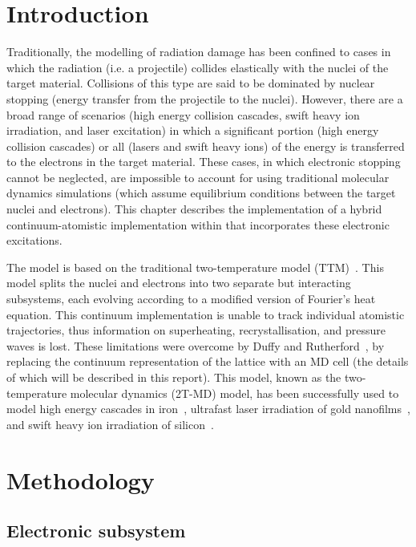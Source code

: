 \section{Introduction}
 
Traditionally, the modelling of radiation damage has been confined to 
cases in which the radiation (i.e. a projectile) collides elastically with the 
nuclei of the target material. Collisions of this type are said to be 
dominated by nuclear stopping (energy transfer from the projectile 
to the nuclei). However, there are a broad range of scenarios (high 
energy collision cascades, swift heavy ion irradiation, and laser 
excitation) in which a significant portion (high energy collision cascades) 
or all (lasers and swift heavy ions) of the energy is transferred to the 
electrons in the target material. These cases, in which electronic stopping 
cannot be neglected, are impossible to account for using traditional 
molecular dynamics simulations (which assume equilibrium conditions 
between the target nuclei and electrons). This chapter describes the 
implementation of a hybrid continuum-atomistic implementation within \D 
that incorporates these electronic excitations.

The model is based on the traditional two-temperature model 
(TTM)~\cite{lifshits-60a}. This model splits the nuclei and electrons 
into two separate but interacting subsystems, each evolving according 
to a modified version of Fourier's heat equation. This continuum 
implementation is unable to track individual atomistic trajectories, thus 
information on superheating, recrystallisation, and pressure waves is lost. 
These limitations were overcome by Duffy and 
Rutherford~\cite{duffy-07a, duffy-09a}, by replacing 
the continuum representation of the lattice with an MD cell (the details of 
which will be described in this report). This model, known as the 
two-temperature molecular dynamics (2T-MD) model, has been successfully 
used to model high energy cascades in iron~\cite{zarkadoula-14a}, ultrafast 
laser irradiation of gold nanofilms~\cite{daraszewicz-13a}, and swift heavy ion 
irradiation of silicon~\cite{khara-16a}. 

\section{Methodology}

\subsection*{Electronic subsystem}

